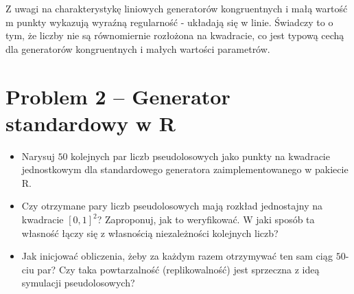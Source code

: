 \documentclass[12pt, a4paper]{article}\usepackage[]{graphicx}\usepackage[]{xcolor}
\newenvironment{knitrout}{}{} %
\begin{document}
\begin{itemize}
\begin{minipage}{\linewidth}
\begin{knitrout}
{}


\end{knitrout}
\end{minipage}

Z uwagi na charakterystykę liniowych generatorów kongruentnych i małą wartość m punkty wykazują wyraźną regularność - układają się w linie. Świadczy to o tym, że liczby nie są równomiernie rozłożona na kwadracie, co jest typową cechą dla generatorów kongruentnych i małych wartości parametrów.


\end{itemize}

\newpage
\section{Problem 2 -- Generator standardowy w R}

\begin{itemize}
\item Narysuj $50$ kolejnych par liczb pseudolosowych jako punkty na kwadracie jednostkowym dla standardowego generatora zaimplementowanego w pakiecie R. 
\item Czy otrzymane pary liczb pseudolosowych mają rozkład jednostajny na kwadracie $[0,1]^2$? Zaproponuj, jak to weryfikować. W jaki sposób ta własność łączy się z własnością niezależności kolejnych liczb?
\item Jak inicjować obliczenia, żeby za każdym razem otrzymywać ten sam ciąg $50$-ciu par? Czy taka powtarzalność (replikowalność) jest sprzeczna z ideą symulacji pseudolosowych?
 \end{itemize}

\medskip
\end{document}
